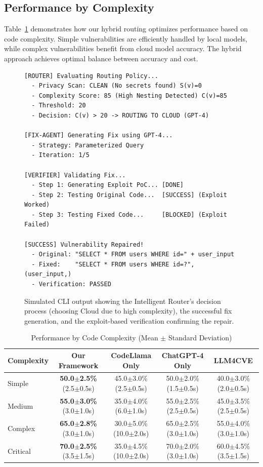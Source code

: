 \documentclass[conference]{IEEEtran}
\begin{document}
\subsection{Performance by Complexity}

Table~\ref{tab:complexity} demonstrates how our hybrid routing optimizes performance based on code complexity. Simple vulnerabilities are efficiently handled by local models, while complex vulnerabilities benefit from cloud model accuracy. The hybrid approach achieves optimal balance between accuracy and cost.

\begin{figure}[t]
\centering
\begin{small}
\begin{verbatim}
[ROUTER] Evaluating Routing Policy...
  - Privacy Scan: CLEAN (No secrets found) S(v)=0
  - Complexity Score: 85 (High Nesting Detected) C(v)=85
  - Threshold: 20
  - Decision: C(v) > 20 -> ROUTING TO CLOUD (GPT-4)

[FIX-AGENT] Generating Fix using GPT-4...
  - Strategy: Parameterized Query
  - Iteration: 1/5

[VERIFIER] Validating Fix...
  - Step 1: Generating Exploit PoC... [DONE]
  - Step 2: Testing Original Code...  [SUCCESS] (Exploit Worked)
  - Step 3: Testing Fixed Code...     [BLOCKED] (Exploit Failed)

[SUCCESS] Vulnerability Repaired!
  - Original: "SELECT * FROM users WHERE id=" + user_input
  - Fixed:    "SELECT * FROM users WHERE id=?", (user_input,)
  - Verification: PASSED
\end{verbatim}
\end{small}
\caption{Simulated CLI output showing the Intelligent Router's decision process (choosing Cloud due to high complexity), the successful fix generation, and the exploit-based verification confirming the repair.}
\label{fig:output_screenshot}
\end{figure}

\begin{table}[t]
\centering
\caption{Performance by Code Complexity (Mean $\pm$ Standard Deviation)}
\label{tab:complexity}
\begin{tabular}{lcccc}
\toprule
\textbf{Complexity} & \textbf{Our Framework} & \textbf{CodeLlama Only} & \textbf{ChatGPT-4 Only} & \textbf{LLM4CVE} \\
\midrule
Simple & \textbf{50.0$\pm$2.5\%} (2.5$\pm$0.5s) & 45.0$\pm$3.0\% (2.5$\pm$0.5s) & 50.0$\pm$2.0\% (1.5$\pm$0.5s) & 40.0$\pm$3.0\% (2.0$\pm$0.5s) \\
Medium & \textbf{55.0$\pm$3.0\%} (3.0$\pm$1.0s) & 35.0$\pm$4.0\% (6.0$\pm$1.0s) & 55.0$\pm$2.5\% (2.5$\pm$0.5s) & 45.0$\pm$3.5\% (2.5$\pm$0.5s) \\
Complex & \textbf{65.0$\pm$2.8\%} (3.0$\pm$1.0s) & 30.0$\pm$5.0\% (10.0$\pm$2.0s) & 65.0$\pm$2.5\% (3.0$\pm$1.0s) & 55.0$\pm$4.0\% (3.0$\pm$1.0s) \\
Critical & \textbf{70.0$\pm$2.5\%} (3.5$\pm$1.5s) & 35.0$\pm$4.5\% (10.0$\pm$2.0s) & 70.0$\pm$2.0\% (3.0$\pm$1.0s) & 60.0$\pm$4.5\% (3.5$\pm$1.5s) \\
\bottomrule
\end{tabular}
\end{table}
\end{document}
